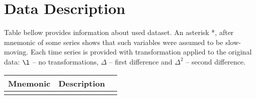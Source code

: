 \documentclass[a4paper, 14pt]{article}
\begin{document}
\section{Data Description}
Table bellow provides information about used dataset. An asterisk *, after mnemonic of some series shows that such variables were assumed to be slow-moving. Each time series is provided with transformation applied to the original data: $\l$ -- no transformations, $\Delta$ -- first difference and $\Delta^2$ -- second difference. 
\begin{center}
	\begin{longtable}{p{5.5cm} p{10cm} p{0.15cm}}
		
		\hline \hline \multicolumn{1}{c}{\textbf{Mnemonic}} & \multicolumn{1}{c}{\textbf{Description}} & \multicolumn{1}{c}{\textbf{}} \\ \hline 
		\endfirsthead
		
		
	
		\endhead
		
		
		\endfoot
		
		\hline \hline
		\endlastfoot
		

\end{longtable}
\end{center}
\end{document}
